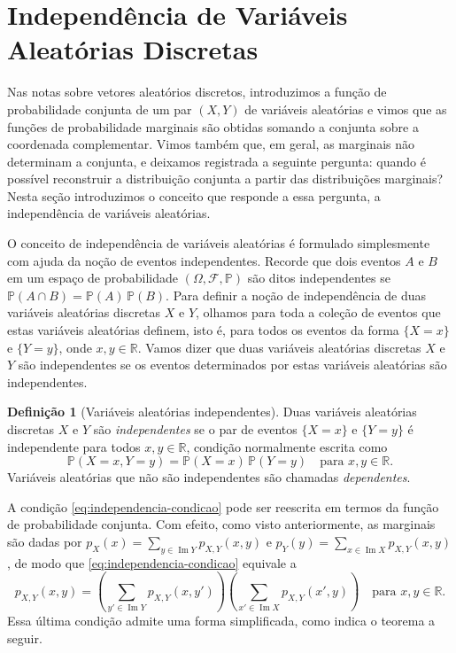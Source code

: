 \documentclass[12pt,portuguese]{article}
\theoremstyle{definition}
\newtheorem{definition}[definition]{Definição}
\begin{document}
\section{Independência de Variáveis Aleatórias Discretas}
\label{sec:independencia}

Nas notas sobre vetores aleatórios discretos, introduzimos a função de
probabilidade conjunta de um par $(X,Y)$ de variáveis aleatórias e vimos que as funções de
probabilidade marginais são obtidas somando a conjunta sobre a coordenada
complementar. Vimos também que, em geral, as marginais não determinam a
conjunta, e deixamos registrada a seguinte pergunta: quando é possível
reconstruir a distribuição conjunta a partir das distribuições marginais?
Nesta seção introduzimos o conceito que responde a essa pergunta, a
independência de variáveis aleatórias.


O conceito de independência de variáveis aleatórias é formulado simplesmente
com ajuda da noção de eventos independentes. 
Recorde que dois eventos $A$ e
$B$ em um espaço de probabilidade $(\Omega,\mathscr{F},\mathbb{P})$
são ditos independentes se $\mathbb{P}(A\cap B) = \mathbb{P}(A)\,\mathbb{P}(B)$.
Para definir a noção de independência de duas variáveis aleatórias discretas $X$ e $Y$, olhamos
para toda a coleção de eventos que estas variáveis aleatórias definem, isto é, 
para todos os eventos da forma $\{X=x\}$ e $\{Y=y\}$, onde $x, y \in \mathbb{R}$. 
Vamos dizer que duas variáveis aleatórias discretas $X$ e $Y$ são independentes
se os eventos determinados por estas variáveis aleatórias são independentes. 

\begin{definition}[Variáveis aleatórias independentes]\label{def:independencia-variaveis}
Duas variáveis aleatórias discretas $X$ e $Y$ são \emph{independentes} se o par de
eventos $\{X = x\}$ e $\{Y = y\}$ é independente para todos $x, y \in \mathbb{R}$,
condição normalmente escrita como
\begin{equation}\label{eq:independencia-condicao}
\mathbb{P}(X = x, Y = y) = \mathbb{P}(X = x)\,\mathbb{P}(Y = y)
\quad \text{para } x, y \in \mathbb{R}.
\end{equation}
Variáveis aleatórias que não são independentes são chamadas \emph{dependentes}.
\end{definition}

A condição \eqref{eq:independencia-condicao} pode ser reescrita em termos da
função de probabilidade conjunta. Com efeito, como visto anteriormente, as marginais são dadas por
$p_X(x) = \sum_{y\in\operatorname{Im}Y} p_{X,Y}(x,y)$ e
$p_Y(y) = \sum_{x\in\operatorname{Im}X} p_{X,Y}(x,y)$, de modo que
\eqref{eq:independencia-condicao} equivale a
\[
p_{X,Y}(x,y) = \left(\sum_{y'\in\operatorname{Im}Y} p_{X,Y}(x,y')\right)
\left(\sum_{x'\in\operatorname{Im}X} p_{X,Y}(x',y)\right)
\quad \text{para } x, y \in \mathbb{R}.
\]
Essa última condição admite uma forma simplificada, como indica o teorema a
seguir.
\end{document}
